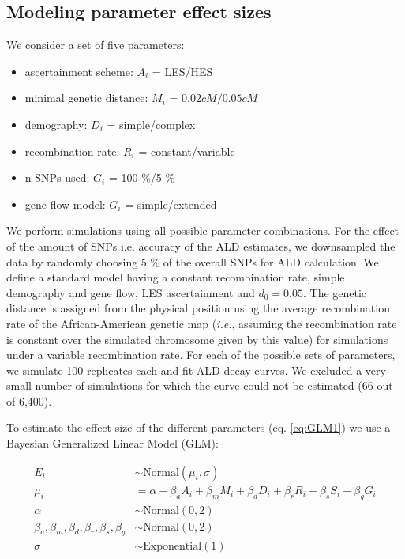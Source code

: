 \documentclass[11pt]{article}
\begin{document}
\subsection{Modeling parameter effect sizes}\label{modeling prameter effect sizes}

We consider a set of five parameters:
\begin{itemize} 
    \item ascertainment scheme: $A_i$ = LES/HES
    \item minimal genetic distance: $M_i$ = $0.02 cM/ 0.05 cM$
    \item demography: $D_i$ = simple/complex
    \item recombination rate: $R_i$ = constant/variable
    \item n SNPs used: $G_i$ = 100 \%/5 \%
    \item gene flow model: $G_i$ = simple/extended
\end{itemize}

We perform simulations using all possible parameter combinations. For the effect of the amount of SNPs i.e. accuracy of the ALD estimates, we downsampled the data by randomly choosing 5 \% of the overall SNPs for ALD calculation.
We define a standard model having a constant recombination rate, simple demography and gene flow, LES ascertainment and $d_0 = 0.05$.
The genetic distance is assigned from the physical  position using the average recombination rate of the African-American genetic map (\emph{i.e.}, assuming the recombination rate is constant over the simulated chromosome given by this value) for simulations under a variable recombination rate.
For each of the possible sets of parameters, we simulate 100 replicates each and fit ALD decay curves. We excluded a very small number of simulations for which the curve could not be estimated (66 out of 6,400). 



To estimate the effect size of the different parameters (eq.
\ref{eq:GLM1}) we use a Bayesian Generalized Linear Model (GLM):

\begin{equation}\label{eq:GLM1}
\begin{split}
E_i &\sim \text{Normal}(\mu_i,\sigma) \\
\mu_i &= \alpha + \beta_aA_i + \beta_mM_i + \beta_dD_i + \beta_rR_i + \beta_{s}S_i + \beta_gG_i \\
\alpha &\sim \text{Normal}(0,2) \\
\beta_a,\beta_m,\beta_d,\beta_r,\beta_{s},\beta_g &\sim \text{Normal}(0,2) \\
\sigma &\sim \text{Exponential}(1)
\end{split}
\end{equation}
\end{document}
